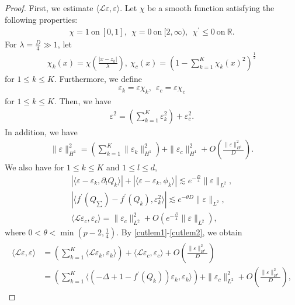 \documentclass[reqno]{amsart}
\theoremstyle{plain}
\theoremstyle{definition}
\numberwithin{equation}{section}
\newcommand{\1}{\mathbbm{1}}
\begin{document}
\begin{proof}
First, we estimate $\langle \mathcal{L}\varepsilon,\varepsilon\rangle$. Let $\chi$ be a smooth function satisfying the following properties:
\begin{align*}
\chi=1\ \mbox{on}\ [0,1],\ \ \chi=0\ \mbox{on}\ [2,\infty),\ \ \chi^{\prime}\leq 0 \ \mbox{on}\ \mathbb{R}.
\end{align*}
For $\lambda=\frac{D}{4}\gg 1$, let
\begin{align*}
\chi_k(x)=\chi\left( \frac{|x-z_k|}{\lambda}\right),\ \chi_c(x)=\left(1-\sum_{k=1}^K\chi_k(x)^2\right)^{\frac{1}{2}}
\end{align*}
for $1\leq k\leq K$. Furthermore, we define
\begin{align}
\varepsilon_k=\varepsilon \chi_k,\ \ \varepsilon_c=\varepsilon\chi_c\label{cutlem1}
\end{align}
for $1\leq k\leq K$. Then, we have
\begin{align}
\varepsilon^2=\left(\sum_{k=1}^K \varepsilon_k^2\right)+\varepsilon_c^2.
\end{align}
In addition, we have
\begin{align}
\|\varepsilon\|_{H^1}^2=\left(\sum_{k=1}^K\|\varepsilon_k\|_{H^1}^2\right)+\|\varepsilon_c\|_{H^1}^2+O\left(\frac{\|\varepsilon\|_{H^1}^2}{D}\right).
\end{align}
We also have for $1\leq k\leq K$ and $1\leq l\leq d$,
\begin{align}
\left| \langle \varepsilon-\varepsilon_k,{\partial}_lQ_k\rangle\right|+\left|\langle \varepsilon-\varepsilon_k,\phi_k\rangle\right|\lesssim e^{-\frac{D}{4}}\|\varepsilon\|_{L^2},
\\
\left|\langle f^{\prime}(Q_{\sum})-f^{\prime}(Q_k),\varepsilon_k^2\rangle\right|\lesssim e^{-\theta D}\|\varepsilon\|_{L^2},
\\
\langle \mathcal{L}\varepsilon_c,\varepsilon_c\rangle=\|\varepsilon_c\|_{L^2}^2+O(e^{-\frac{D}{4}}\|\varepsilon\|_{L^2}),\label{cutlem2}
\end{align}
where $0<\theta<\min{(p-2,\frac{1}{4})}$. By \eqref{cutlem1}-\eqref{cutlem2}, we obtain
\begin{align}\label{cutes1}
\begin{aligned}
\langle \mathcal{L}\varepsilon,\varepsilon\rangle&=\left(\sum_{k=1}^K \langle \mathcal{L}\varepsilon_k,\varepsilon_k\rangle\right)+\langle \mathcal{L}\varepsilon_c,\varepsilon_c\rangle+O\left(\frac{\|\varepsilon\|_{H^1}^2}{D}\right)
\\
&=\left(\sum_{k=1}^K\langle (-\Delta+1-f^{\prime}(Q_k))\varepsilon_k,\varepsilon_k\rangle \right)+\|\varepsilon_c\|_{L^2}^2+O\left(\frac{\|\varepsilon\|_{H^1}^2}{D}\right),

\end{aligned}
\end{align}
\end{proof}
\end{document}
